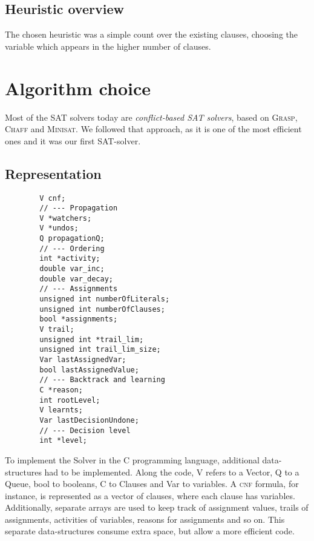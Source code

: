     \subsection{Heuristic overview}
    The chosen heuristic was a simple count over the existing clauses, choosing the variable which appears in the higher number of clauses. \\
    
    \newpage
    
    \section{Algorithm choice}
    Most of the SAT solvers today are \textit{conflict-based SAT solvers}, based on \textsc{Grasp}, \textsc{Chaff} and \textsc{Minisat}. We followed that approach, as it is one of the most efficient ones and it was our first SAT-solver. \\
    
    \subsection{Representation}
    \begin{multicols}{2}
    \begin{lstlisting}
        V cnf;
        // --- Propagation
        V *watchers;
        V *undos;
        Q propagationQ;
        // --- Ordering
        int *activity;
        double var_inc;
        double var_decay;
        // --- Assignments
        unsigned int numberOfLiterals;
        unsigned int numberOfClauses;
        bool *assignments;
        V trail;
        unsigned int *trail_lim;
        unsigned int trail_lim_size;
        Var lastAssignedVar;
        bool lastAssignedValue;
        // --- Backtrack and learning
        C *reason;
        int rootLevel;
        V learnts;
        Var lastDecisionUndone;
        // --- Decision level
        int *level;
	\end{lstlisting}
    \columnbreak
    To implement the Solver in the C programming language, additional data-structures had to be implemented. Along the code, V refers to a Vector, Q to a Queue, bool to booleans, C to Clauses and Var to variables. A \textsc{cnf} formula, for instance, is represented as a vector of clauses, where each clause has variables.\\
    Additionally, separate arrays are used to keep track of assignment values, trails of assignments, activities of variables, reasons for assignments and so on. This separate data-structures consume extra space, but allow a more efficient code. \\
    \end{multicols}
    
